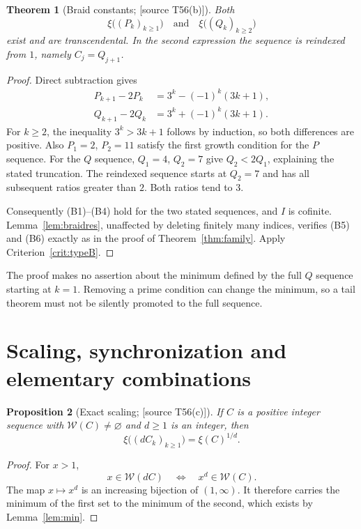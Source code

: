 \documentclass[11pt,a4paper]{article}
\newtheorem{theorem}{Theorem}[section]
\newtheorem{proposition}[theorem]{Proposition}
\theoremstyle{definition}\newtheorem{definition}[theorem]{Definition}
\theoremstyle{remark}\newtheorem{remark}[theorem]{Remark}
\newcommand{\sourceT}[1]{\textup{[source T#1]}}
\newcommand{\WW}{\mathcal W}
\begin{document}
\begin{theorem}[Braid constants; \sourceT{56(b)}]\label{thm:braids}
Both
\[
 \xi\bigl((P_k)_{k\ge1}\bigr)
 \quad\text{and}\quad
 \xi\bigl((Q_k)_{k\ge2}\bigr)
\]
exist and are transcendental. In the second expression the sequence
is reindexed from $1$, namely $C_j=Q_{j+1}$.
\end{theorem}
\begin{proof}
Direct subtraction gives
\begin{align*}
 P_{k+1}-2P_k&=3^k-(-1)^k(3k+1),\\
 Q_{k+1}-2Q_k&=3^k+(-1)^k(3k+1).
\end{align*}
For $k\ge2$, the inequality $3^k>3k+1$ follows by induction, so both
differences are positive. Also $P_1=2$, $P_2=11$ satisfy the first
growth condition for the $P$ sequence. For the $Q$ sequence,
$Q_1=4$, $Q_2=7$ give $Q_2<2Q_1$, explaining the stated truncation.
The reindexed sequence starts at $Q_2=7$ and has all subsequent
ratios greater than $2$. Both ratios tend to $3$.

Consequently (B1)--(B4) hold for the two stated sequences, and $I$ is
cofinite. Lemma~\ref{lem:braidres}, unaffected by deleting finitely
many indices, verifies (B5) and (B6) exactly as in the proof of
Theorem~\ref{thm:family}. Apply Criterion~\ref{crit:typeB}.
\end{proof}

The proof makes no assertion about the minimum defined by the full
$Q$ sequence starting at $k=1$. Removing a prime condition can change
the minimum, so a tail theorem must not be silently promoted to the
full sequence.

\section{Scaling, synchronization and elementary combinations}
\begin{proposition}[Exact scaling; \sourceT{56(c)}]\label{prop:scaling}
If $C$ is a positive integer sequence with $\WW(C)\ne\varnothing$
and $d\ge1$ is an integer, then
\[
 \xi\bigl((dC_k)_{k\ge1}\bigr)=\xi(C)^{1/d}.
\]
\end{proposition}
\begin{proof}
For $x>1$,
\[
 x\in\WW(dC)\quad\Longleftrightarrow\quad x^d\in\WW(C).
\]
The map $x\mapsto x^d$ is an increasing bijection of $(1,\infty)$.
It therefore carries the minimum of the first set to the minimum of
the second, which exists by Lemma~\ref{lem:min}.
\end{proof}
\end{document}
